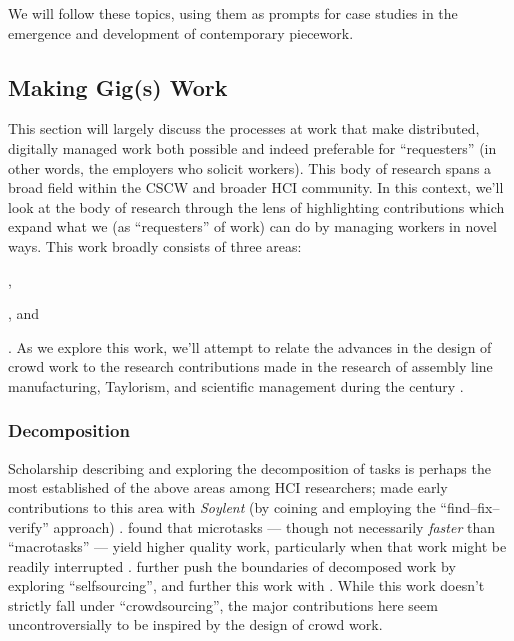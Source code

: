\documentclass{sigchi}
\begin{document}
We will follow these topics, using them as prompts for case studies in
the emergence and
development of contemporary piecework.

\subsection{Making Gig(s) Work}\label{sec:MakingGigsWork}

This section will largely discuss the processes at work that make distributed,
digitally managed work both possible and indeed preferable for ``requesters''
(in other words, the employers who solicit workers).
This body of research spans a broad field
within the CSCW and broader HCI community.
In this context,
we'll look at the body of research through the lens of
highlighting contributions which expand what we
(as ``requesters'' of work) can do by managing workers in novel ways.
This work broadly consists of three areas:
\begin{inlinelist}
\item {},
\item {}, and
\item {}
\end{inlinelist}.
As we explore this work, we'll
attempt to relate the advances in the design of crowd work to
the research contributions made in the research of assembly line manufacturing,
Taylorism, and
scientific management 
during the  century
\cite{hu1961parallel}.


\subsubsection{Decomposition}\label{sec:decomposition}
Scholarship describing and exploring
the decomposition of tasks is perhaps the most established of the above areas among HCI researchers;
\citeauthor{bernsteinSoylent} made early contributions to this area with \textit{Soylent}
(by coining and employing the ``find--fix--verify'' approach)
\cite{bernsteinSoylent}.
\citeauthor{cheng2015break} found that microtasks
--- though not necessarily \textit{faster} than ``macrotasks'' ---
yield higher quality work,
particularly when that work might be readily interrupted
\cite{cheng2015break}.
\citeauthor{selfsourcingTeevan2014} further push the boundaries of decomposed work
by exploring ``selfsourcing'', and further this work with \citeauthor{selfsourcingTeevan2016}
\cite{selfsourcingTeevan2014,selfsourcingTeevan2016}.
While this work doesn't strictly fall under ``crowdsourcing'',
the major contributions here
seem uncontroversially to be inspired by the design of crowd work.
\end{document}
